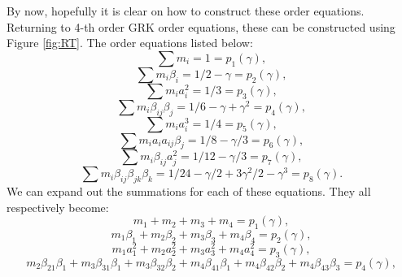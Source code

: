 \documentclass{ansconf}
\numberwithin{equation}{section}
\begin{document}

By now, hopefully it is clear on how to construct these order equations. Returning to 4-th order GRK order equations, these can be constructed using Figure \ref{fig:RT}. The order equations listed below:
\begin{equation}
  \sum m_i = 1 = p_1\left(\gamma\right),
\end{equation}
\begin{equation}
  \sum m_i\beta_i = 1/2 - \gamma = p_2\left(\gamma\right),
\end{equation}
\begin{equation}
  \sum m_ia_i^2 = 1/3 = p_3\left(\gamma\right),
\end{equation}
\begin{equation}
  \sum m_i\beta_{ij}\beta_j = 1/6 - \gamma + \gamma^2 = p_4\left(\gamma\right),
\end{equation}
\begin{equation}
  \sum m_ia_i^3 = 1/4 = p_5\left(\gamma\right),
\end{equation}
\begin{equation}
  \sum m_ia_ia_{ij}\beta_j = 1/8 - \gamma/3 = p_6\left(\gamma\right),
\end{equation}
\begin{equation}
  \sum m_i\beta_{ij}a_j^2 = 1/12 - \gamma/3 = p_7\left(\gamma\right),
\end{equation}
\begin{equation}
  \sum m_i\beta_{ij}\beta_{jk}\beta_{k} = 1/24 - \gamma/2 + 3\gamma^2/2 - \gamma^3 = p_8\left(\gamma\right).
\end{equation}  
We can expand out the summations for each of these equations. They all respectively become:
\begin{equation}
   m_1 + m_2 + m_3 + m_4 = p_1\left(\gamma\right),
\end{equation}
\begin{equation}
   m_1\beta_1 + m_2\beta_2 + m_3\beta_3 + m_4\beta_4 = p_2\left(\gamma\right),
\end{equation}
\begin{equation}
   m_1a^2_1 + m_2a^2_2 + m_3a^2_3 + m_4a^2_4 = p_3\left(\gamma\right),
\end{equation}
\begin{equation}
   m_2\beta_{21}\beta_1 + m_3\beta_{31}\beta_1 + m_3\beta_{32}\beta_2 + m_4\beta_{41}\beta_1 + m_4\beta_{42}\beta_2 + m_4\beta_{43}\beta_3 = p_4\left(\gamma\right),
\end{equation}
\end{document}

